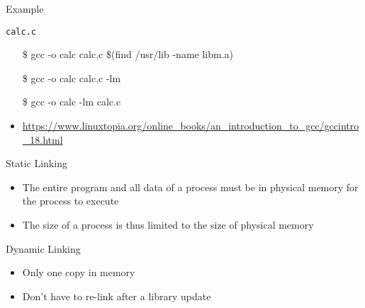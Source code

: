 \begin{frame}{Example}
  \begin{iblock}{\texttt{calc.c}}
  \end{iblock}\ttfamily
  \begin{itemize}
  \item[\$] gcc -o calc calc.c \$(find /usr/lib -name libm.a) \correct
  \item[\$] gcc -o calc calc.c -lm \correct
  \item[\$] gcc -o calc -lm calc.c \Bad
  \end{itemize}
\end{frame}

\begin{itemize}
\item \url{https://www.linuxtopia.org/online_books/an_introduction_to_gcc/gccintro_18.html}
\end{itemize}

\begin{frame}
  \begin{block}{Static Linking}
    \begin{itemize}
    \item The entire program and all data of a process must be in physical memory for the
      process to execute
    \item The size of a process is thus limited to the size of physical memory
    \end{itemize}
  \end{block}
    \begin{center}
  \end{center}
\end{frame}

\begin{frame}
  \begin{block}{Dynamic Linking}
    \begin{itemize}
    \item Only one copy in memory
    \item Don't have to re-link after a library update
    \end{itemize}
  \end{block}
  \begin{center}
  \end{center}
\end{frame}

